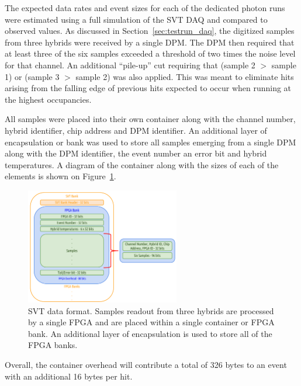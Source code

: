 
%
%

The expected data rates and event sizes for each of the dedicated photon runs
were estimated using a full simulation of the SVT DAQ and compared to observed
values. As discussed in Section~\ref{sec:testrun_daq}, the digitized samples
from three hybrids were received by a single DPM.  The DPM then required that
at least three of the six samples exceeded a threshold of two times the noise
level for that channel.  An additional ``pile-up'' cut requiring that 
(sample 2 $>$ sample 1) or (sample 3 $>$ sample 2) was also applied. This was
meant to eliminate hits arising from the falling edge of previous hits expected
to occur when running at the highest occupancies.

All samples were placed into their own container along with the 
channel number, hybrid identifier, chip address and DPM identifier. An 
additional layer of encapsulation or bank was used to store all samples 
emerging from a single DPM along with the DPM identifier, the event number
an error bit and hybrid temperatures. A diagram of the container along with
the sizes of each of the elements is shown on Figure~\ref{fig:data_format}.
\begin{figure}[h]
    \begin{center}
    	\includegraphics[width=0.60\textwidth]{test2012/svtperformance/daq/svt_data_format.pdf}
        \caption{
                    SVT data format. Samples readout from three hybrids are 
                    processed by a single FPGA and are placed within a single
                    container or FPGA bank.  An additional layer of 
                    encapsulation is used to store all of the FPGA banks.
                 } 
	\label{fig:data_format}
    \end{center}
\end{figure}
Overall, the container overhead will contribute a total of 326 bytes to an event
with an additional 16 bytes per hit.

